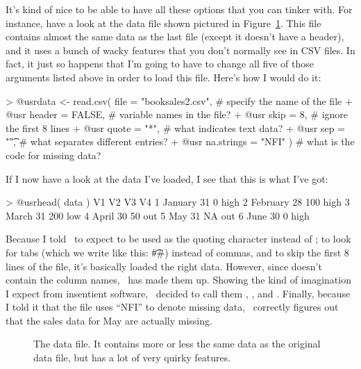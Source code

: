 It's kind of nice to be able to have all these options that you can tinker with. For instance, have a look at the data file shown pictured in Figure~\ref{fig:booksales2csv}. This file contains almost the same data as the last file (except it doesn't have a header), and it uses a bunch of wacky features that you don't normally see in CSV files. In fact, it just so happens that I'm going to have to change all five of those arguments listed above in order to load this file. Here's how I would do it:
\begin{rblock1}
> @usr{data <- read.csv( file = "booksales2.csv",}  # specify the name of the file
+ @usr{                  header = FALSE,}           # variable names in the file?
+ @usr{                  skip = 8, }                # ignore the first 8 lines
+ @usr{                  quote = "*",}              # what indicates text data?
+ @usr{                  sep = "\t",}               # what separates different entries?
+ @usr{                  na.strings = "NFI" )}      # what is the code for missing data?
\end{rblock1} 
If I now have a look at the data I've loaded, I see that this is what I've got:
\begin{rblock1}
> @usr{head( data )}
         V1 V2  V3   V4
1   January 31   0 high
2 February  28 100 high
3    March  31 200  low
4    April  30  50  out
5     May   31  NA  out
6     June  30   0 high
\end{rblock1}
Because I told \R\ to expect \rtext{*} to be used as the quoting character instead of ; to look for tabs (which we write like this: \rtextverb#\t#) instead of commas, and to skip the first 8 lines of the file, it's basically loaded the right data. However, since  doesn't contain the column names, \R\ has made them up. Showing the kind of imagination I expect from insentient software, \R\ decided to call them , ,  and . Finally, because I told it that the file uses ``NFI'' to denote missing data, \R\ correctly figures out that the sales data for May are actually missing. 

\begin{figure}[t]
\begin{center}
\caption{The  data file. It contains more or less the same data as the original  data file, but has a lot of very quirky features.}
\label{fig:booksales2csv}
\HR
\end{center}
\end{figure} 

